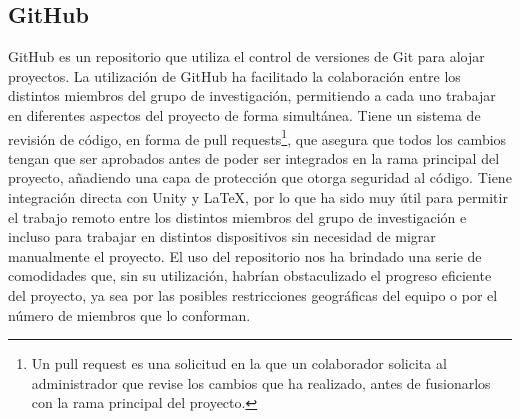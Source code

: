 \subsection{GitHub}

GitHub es un repositorio que utiliza el control de versiones de Git para alojar proyectos. La utilización de GitHub ha facilitado la colaboración entre los distintos miembros del grupo de investigación, permitiendo a cada uno trabajar en diferentes aspectos del proyecto de forma simultánea. Tiene un sistema de revisión de código, en forma de pull requests\footnote{Un pull request es una solicitud en la que un colaborador solicita al administrador que revise los cambios que ha realizado, antes de fusionarlos con la rama principal del proyecto.}, que asegura que todos los cambios tengan que ser aprobados antes de poder ser integrados en la rama principal del proyecto, añadiendo una capa de protección que otorga seguridad al código. Tiene integración directa con Unity y LaTeX, por lo que ha sido muy útil para permitir el trabajo remoto entre los distintos miembros del grupo de investigación e incluso para trabajar en distintos dispositivos sin necesidad de migrar manualmente el proyecto. El uso del repositorio nos ha brindado una serie de comodidades que, sin su utilización, habrían obstaculizado el progreso eficiente del proyecto, ya sea por las posibles restricciones geográficas del equipo o por el número de miembros que lo conforman.